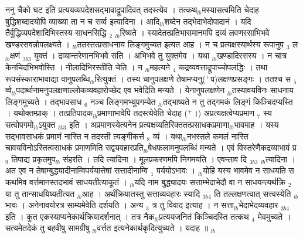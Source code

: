 \documentclass[article,12pt,a4paper]{memoir}%
\newcommand{\add}[1]{($^{+}$#1)}
\newcounter{parCount}
\begin{document}
	  
	  \pstart \leavevmode%
	ननु चैको घट इति प्रत्ययव्यपदेशसद्भावाद्रूपादिवत् तदस्त्येव । तत्कथ{\tiny $_{lb}$}मस्यासत्वमिति चेदाह {\color{DodgerBlue3}बुद्धिशब्दादयोपि व्याख्या} ता न च सर्व्व इत्यादिना । आदि{\tiny $_{lb}$}शब्देन तद्भेदाभेदोपादानं । यदि तैर्वुद्धिव्यपदेशादिभिस्तस्य साधनसिद्धि {\tiny $_{2}$} {\tiny $_{lb}$}रिष्यते । स्यादेतत्प्रतिभासमानमपि द्रव्यं लवणरसाभिभवे खण्डरसवन्नोपलक्ष्यते । {\tiny $_{lb}$}ततस्तत्प्रसाधनाय लिङ्गमुच्यत इत्यत आह । {\color{DodgerBlue3}न च प्रत्यक्षस्यार्थस्य रूपानुप {\tiny $_{3}$} ल{\tiny $_{lb}$}क्षणं} {\tiny $_{3b3}$} युक्तं । द्रव्यान्तरेणानभिभवे सति । अभिभवे तु युक्तमेव । यथा {\tiny $_{lb}$}खण्डादिरसस्य । न चात्र केनचिदभिभवोस्ति । नीलादिभिरस्तीति चेति । न {\tiny $_{lb}$}महत्यने {\tiny $_{4}$} कद्रव्यवत्ताद्रूपाच्चोपलद्धिः । तथा रूपसंस्काराभावाद्या वानुपलब्धि{\tiny $_{lb}$}रित्युक्तं । तस्य चानुपलक्षणे तेषामप्यनु\add{प}लक्षणप्रसङ्गः । ततश्च स {\tiny $_{5}$} र्व्व{\tiny $_{lb}$}पदार्थानामनुपलक्षणाल्लोकव्यवहारोच्छेद एव भवेदिति मन्यते । येनानुपलक्षणेन {\tiny $_{lb}$}तस्यावयविनः साधनाय लिङ्गमुच्यते । तद्भावसाध {\tiny $_{6}$} नञ्च लिङ्गमभ्युपगम्येत {\tiny $_{lb}$}तद्भाष्यते न तु तद्गमकं लिङ्गं किञ्चिदप्यस्ति । यथोक्तम्प्राक् । तत्प्रतिपादक{\tiny $_{lb}$}प्रमाणाभावेपि तदस्त्येवेति चेदाह \add{।} {\color{DodgerBlue3}अप्रत्यक्षत्वेप्यप्रमाण {\tiny $_{7}$} स्य सत्वोपगमो{\tiny $_{lb}$}ऽयुक्त} {\tiny $_{3b3}$} इति । अप्रमाणस्येत्यनेन प्रत्यक्षव्यतिरिक्ततत्प्रसाधकप्रमाणा{\tiny $_{lb}$}भावमाह । यस्य {\color{DodgerBlue3}सद्भावसाधकं प्रमाणं नास्ति न तदस्ती} त्यङ्गीकर्त्त {\tiny $_{8}$} व्यं । यथा{\tiny $_{lb}$}नभस्तले कमलं नास्ति चावयविनोऽस्तित्वसाधकं प्रमाणमिति सद्व्यवहारप्रति{\tiny $_{lb}$}षेधफलामनुपलब्धिं मन्यते । एवं विस्तरेणैकद्रव्याभावं प्र {\tiny $_{9}$} \leavevmode{} तिपाद्य प्रकृतमुप{\tiny $_{lb}$} \leavevmode{} संहरति । {\color{DodgerBlue3}तदि} त्यादिना । मूलप्रकरणमपि निगमयति । {\color{DodgerBlue3}एवन्ताव} दि {\tiny $_{3b3}$} {\tiny $_{lb}$}त्यादिना । अत एव न तेषाम्बुद्ध्यादीनाम्विपर्ययात्तेषां सत्तादीनाम्वि {\tiny $_{1}$} पर्ययोऽभावः । {\tiny $_{lb}$}योहि यस्य भावमेव न साधयति स कथमिव वर्त्तमानस्तदभावं साधयतीत्याकूतं । {\tiny $_{lb}$}यदि नाम बुद्ध्यादयः सत्ताम्भेदाभेदौ वा न साधयन्त्यर्थक्रि {\tiny $_{2}$} या तु तान्साधयिष्यतीत्यत {\tiny $_{lb}$}आह । {\color{DodgerBlue3}अर्थंक्रियातस्तु सत्ताव्यवहारः स्यादि} {\tiny $_{3b4}$} ति तल्लक्षणत्वात् सत्त्वस्येति {\tiny $_{lb}$}भावः । अनेनावयोरत्र साम्यमेवेति दर्शयति । अन्य {\tiny $_{3}$} त्र तु विवाद इत्याह । {\color{DodgerBlue3}न सत्ता{\tiny $_{lb}$}भेदाभेदव्यवहार} {\tiny $_{3b4}$} इति । कुत एकस्याप्यनेकार्थक्रियादर्शनात् । तत्र नैक{\tiny $_{lb}$}प्रत्ययजनितं किञ्चिदस्ति तत्कथ {\tiny $_{4}$} मेवमुच्यते । सत्यमेतदेकं तु बहवीषु सामग्रीषु {\tiny $_{lb}$}वर्त्तत इत्यनेकार्थकृदित्युच्यते । यदाह ॥
	{}
	\pend%
      {\tiny $_{lb}$}
	  \bigskip
	  \begingroup
	
\end{document}
